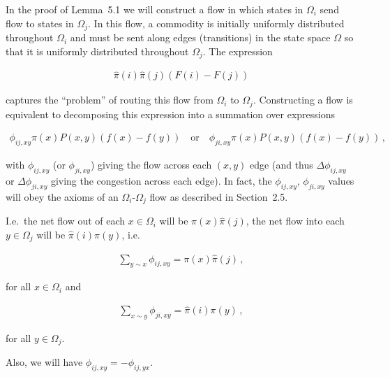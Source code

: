 \documentclass[10pt,a4paper]{article}
\begin{document}
In the proof of Lemma 5.1 we will construct a flow in which states in $\Omega_{i}$ send flow to states in $\Omega_{j}$. In this flow, a commodity is initially uniformly distributed throughout $\Omega_{i}$ and must be sent along edges (transitions) in the state space $\Omega$ so that it is uniformly distributed throughout $\Omega_{j}$. The expression\par


\[\begin{gathered}
\hat{\pi}(i)\hat{\pi}(j)(F(i)-F(j))
\end{gathered}\]


captures the “problem” of routing this flow from $\Omega_{i}$ to $\Omega_{j}$. Constructing a flow is equivalent to decomposing this expression into a summation over expressions\par


\[\begin{gathered}
\phi_{ij,xy}\pi(x)P(x,y)(f(x)-f(y))\quad\textrm{or}\quad\phi_{ji,xy}\pi(x)P(x,y)(f(x)-f(y))\,,
\end{gathered}\]




with $\phi_{ij,xy}$ (or $\phi_{ji,xy}$) giving the flow across each $(x,y)$ edge (and thus $\Delta\phi_{ij,xy}$ or $\Delta\phi_{ji,xy}$ giving the congestion across each edge). In fact, the $\phi_{ij,xy}$, $\phi_{ji,xy}$ values will obey the axioms of an $\Omega_{i}$-$\Omega_{j}$ flow as described in Section 2.5.\par




I.e. the net flow out of each $x\in\Omega_{i}$ will be $\pi(x)\hat{\pi}(j)$, the net flow into each $y\in\Omega_{j}$ will be $\hat{\pi}(i)\pi(y)$, i.e.\par


\[\begin{gathered}
\sum_{y\sim x}\phi_{ij,xy}=\pi(x)\hat{\pi}(j)\,,
\end{gathered}\]


for all $x\in\Omega_{i}$
and\par


\[\begin{gathered}
\sum_{x\sim y}\phi_{ji,xy}=\hat{\pi}(i)\pi(y)\,,
\end{gathered}\]


for all $y\in\Omega_{j}$.\par




Also, we will have $\phi_{ij,xy}=-\phi_{ij,yx}$.\par
\end{document}
